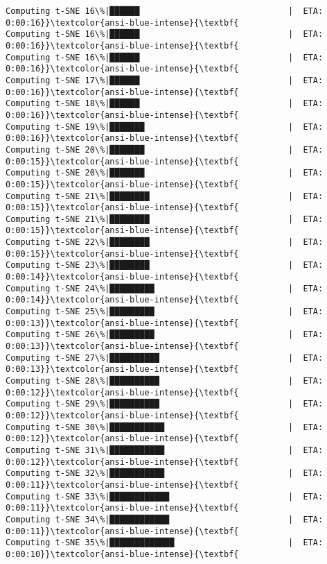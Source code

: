 \documentclass[11pt]{article}
\begin{document}
\begin{Verbatim}[commandchars=\\\{\}]
Computing t-SNE 16\%|██████                              |  ETA: 0:00:16}}\textcolor{ansi-blue-intense}{\textbf{
Computing t-SNE 16\%|██████                              |  ETA: 0:00:16}}\textcolor{ansi-blue-intense}{\textbf{
Computing t-SNE 16\%|██████                              |  ETA: 0:00:16}}\textcolor{ansi-blue-intense}{\textbf{
Computing t-SNE 17\%|██████                              |  ETA: 0:00:16}}\textcolor{ansi-blue-intense}{\textbf{
Computing t-SNE 18\%|██████                              |  ETA: 0:00:16}}\textcolor{ansi-blue-intense}{\textbf{
Computing t-SNE 19\%|███████                             |  ETA: 0:00:16}}\textcolor{ansi-blue-intense}{\textbf{
Computing t-SNE 20\%|███████                             |  ETA: 0:00:15}}\textcolor{ansi-blue-intense}{\textbf{
Computing t-SNE 20\%|███████                             |  ETA: 0:00:15}}\textcolor{ansi-blue-intense}{\textbf{
Computing t-SNE 21\%|████████                            |  ETA: 0:00:15}}\textcolor{ansi-blue-intense}{\textbf{
Computing t-SNE 21\%|████████                            |  ETA: 0:00:15}}\textcolor{ansi-blue-intense}{\textbf{
Computing t-SNE 22\%|████████                            |  ETA: 0:00:15}}\textcolor{ansi-blue-intense}{\textbf{
Computing t-SNE 23\%|████████                            |  ETA: 0:00:14}}\textcolor{ansi-blue-intense}{\textbf{
Computing t-SNE 24\%|█████████                           |  ETA: 0:00:14}}\textcolor{ansi-blue-intense}{\textbf{
Computing t-SNE 25\%|█████████                           |  ETA: 0:00:13}}\textcolor{ansi-blue-intense}{\textbf{
Computing t-SNE 26\%|█████████                           |  ETA: 0:00:13}}\textcolor{ansi-blue-intense}{\textbf{
Computing t-SNE 27\%|██████████                          |  ETA: 0:00:13}}\textcolor{ansi-blue-intense}{\textbf{
Computing t-SNE 28\%|██████████                          |  ETA: 0:00:12}}\textcolor{ansi-blue-intense}{\textbf{
Computing t-SNE 29\%|██████████                          |  ETA: 0:00:12}}\textcolor{ansi-blue-intense}{\textbf{
Computing t-SNE 30\%|███████████                         |  ETA: 0:00:12}}\textcolor{ansi-blue-intense}{\textbf{
Computing t-SNE 31\%|███████████                         |  ETA: 0:00:12}}\textcolor{ansi-blue-intense}{\textbf{
Computing t-SNE 32\%|███████████                         |  ETA: 0:00:11}}\textcolor{ansi-blue-intense}{\textbf{
Computing t-SNE 33\%|████████████                        |  ETA: 0:00:11}}\textcolor{ansi-blue-intense}{\textbf{
Computing t-SNE 34\%|████████████                        |  ETA: 0:00:11}}\textcolor{ansi-blue-intense}{\textbf{
Computing t-SNE 35\%|█████████████                       |  ETA: 0:00:10}}\textcolor{ansi-blue-intense}{\textbf{

\end{Verbatim}
\end{document}
